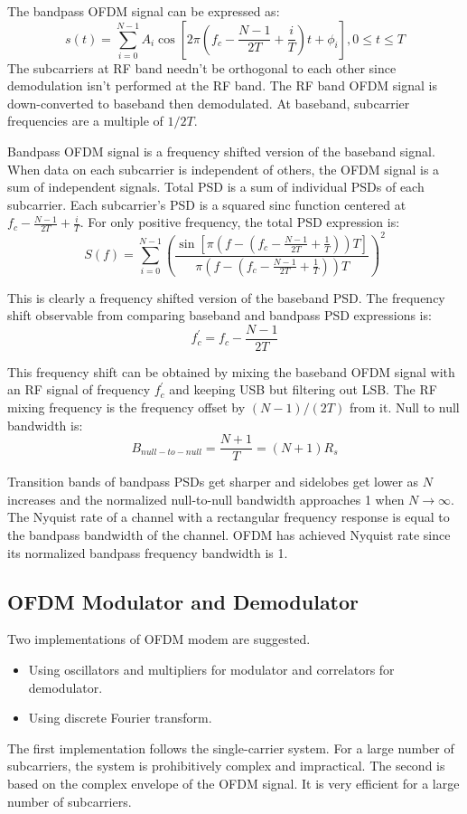 The bandpass \gls{OFDM} signal can be expressed as\cite{fuqin}:
$$s(t) = \sum_{i=0}^{N-1}A_i\cos\left[ 2\pi\left( f_c-\frac{N-1}{2T}+\frac{i}{T}\right)t + \phi_i\right], 0\leq t\leq T$$
The \gls{subcarrier}s at \gls{RF} band needn't be \gls{orthogonal} to each other since demodulation isn't performed at the \gls{RF} band\cite{fuqin}. The RF band OFDM signal is down-converted to baseband then demodulated. At baseband, subcarrier frequencies are a multiple of $1/2T$\cite{fuqin}.

Bandpass OFDM signal is a frequency shifted version of the baseband signal. When data on each subcarrier is independent of others, the OFDM signal is a sum of independent signals. Total PSD is a sum of individual PSDs of each subcarrier. Each subcarrier's PSD is a squared sinc function centered at $f_c - \frac{N-1}{2T}+\frac{i}{T}$. For only positive frequency, the total PSD expression is:
$$S(f) = \sum_{i=0}^{N-1}\left( \frac{\sin\left[ \pi(f-(f_c-\frac{N-1}{2T}+\frac{1}{T}))T\right]}{\pi(f-(f_c-\frac{N-1}{2T}+\frac{1}{T}))T}\right)^2$$

This is clearly a frequency shifted version of the baseband \gls{PSD}. The frequency shift observable from comparing baseband and bandpass \gls{PSD} expressions is:
$$f_c^\prime = f_c - \frac{N-1}{2T}$$

This frequency shift can be obtained by mixing the baseband OFDM signal with an RF signal of frequency $f_c^\prime$ and keeping \gls{USB} but filtering out \gls{LSB}. The RF mixing frequency is the frequency offset by $(N-1)/(2T)$ from it.
Null to null bandwidth is:
$$B_{null-to-null}=\frac{N+1}{T}=(N+1)R_s$$

Transition bands of bandpass PSDs get sharper and sidelobes get lower as $N$ increases and the normalized null-to-null bandwidth approaches 1 when $N\to\infty$\cite{fuqin}.
The Nyquist rate of a channel with a rectangular frequency response is equal to the bandpass bandwidth of the channel. OFDM has achieved Nyquist rate since its normalized bandpass frequency bandwidth is 1\cite{fuqin}. 

\subsection{\gls{OFDM} Modulator and Demodulator}
Two implementations of \gls{OFDM} modem are suggested.
\begin{itemize}
	\item Using oscillators and multipliers for modulator and correlators for demodulator.
	\item Using discrete Fourier transform.
\end{itemize}
The first implementation follows the single-carrier system. For a large number of subcarriers, the system is prohibitively complex and impractical. The second is based on the complex envelope of the \gls{OFDM} signal. It is very efficient for a large number of subcarriers.

